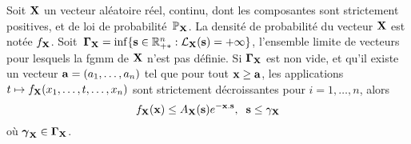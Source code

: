 \begin{Prop}\label{BoundMultivariateTheorem} 
Soit $\bold{X}$ un vecteur aléatoire réel, continu, dont les composantes sont strictement positives, et de loi de probabilité $\,\mathbb{P}_{\bold{X}}$. La densité de probabilité du vecteur $\bold{X}$ est notée $f_{\bold{X}}$. Soit $\,\boldsymbol{\Gamma}_{\bold{X}}=\inf\{\bold{s}\in\mathbb{R}_{+*}^{n} : \mathcal{L}_{\bold{X}}(\bold{s})=+\infty\}$, l'ensemble limite de vecteurs pour lesquels la \gls{fgmm} de $\bold{X}$ n'est pas définie. Si $\boldsymbol{\Gamma}_{\bold{X}}$ est non vide, et qu'il existe un vecteur $\bold{a}=(a_{1},\ldots,a_{n})$ tel que pour tout $\bold{x}\geq\bold{a}$, les applications $t\mapsto f_{\bold{X}}(x_{1},\ldots,t,\ldots,x_{n})$ sont strictement décroissantes pour $i=1,\ldots,n$, alors
\begin{equation}\label{BoundMultivariate}
f_{\bold{X}}(\bold{x}) \leq A_{\bold{X}}(\bold{s})e^{-\bold{x}.\bold{s}},\hspace{0.2cm}\bold{s}\leq\gamma_{\bold{X}}
\end{equation}
où $\boldsymbol{\gamma}_{\bold{X}}\in\boldsymbol{\Gamma}_{\bold{X}}$. 
\end{Prop}
%
